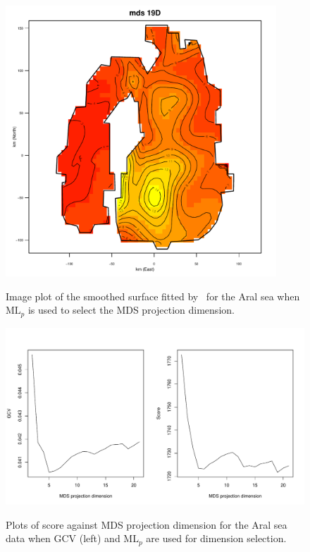 \begin{figure}
\centering
\includegraphics[width=4in]{gds/figs/aral-19d.pdf} \\
\caption{Image plot of the smoothed surface fitted by \mdsds\ for the Aral sea when $\text{ML}_p$ is used to select the MDS projection dimension.}
\label{gds-aral-19d}
\end{figure}


\begin{figure}
\centering
\includegraphics[width=6in]{gds/figs/aral-dim-scores.pdf} \\
\caption{Plots of score against MDS projection dimension for the Aral sea data when GCV (left) and $\text{ML}_p$ are used for dimension selection.}
\label{gds-aral-dim-select}
\end{figure}

